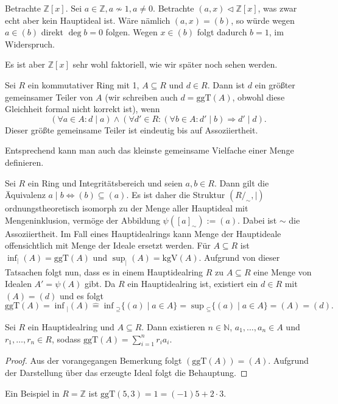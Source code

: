 \begin{example}
    Betrachte $\mathbb{Z}[x]$. Sei $a \in \mathbb{Z}, a \not\sim 1, a \neq 0$. Betrachte $({a,x}) \vartriangleleft \mathbb{Z}[x]$, was zwar echt aber kein Hauptideal ist. Wäre nämlich $({a,x}) = (b)$, so würde wegen $a \in (b)$ direkt $\deg b = 0$ folgen. Wegen $x \in (b)$ folgt dadurch $b = 1$, im Widerspruch.

    Es ist aber $\mathbb{Z}[x]$ sehr wohl faktoriell, wie wir später noch sehen werden.
\end{example}

\begin{definition}
    Sei $R$ ein kommutativer Ring mit 1, $A \subseteq R$ und $d \in R$. Dann ist $d$ ein größter gemeinsamer Teiler von $A$ (wir schreiben auch $d = \mathrm{ggT}(A)$, obwohl diese Gleichheit formal nicht korrekt ist), wenn
    $$ (\forall a \in A: d \mid a ) \land ( \forall d' \in R : ( \forall b \in A: d' \mid b ) \Rightarrow d' \mid d  ). $$
    Dieser größte gemeinsame Teiler ist eindeutig bis auf Assoziiertheit.

    Entsprechend kann man auch das kleinste gemeinsame Vielfache einer Menge definieren.
\end{definition}


\begin{remark}
    Sei $R$ ein Ring und Integritätsbereich und seien $a,b\in R$. Dann gilt die Äquivalenz
    $a\mid b\Leftrightarrow (b)\subseteq (a)$. Es ist daher die Struktur
    $(R/_\sim,\mid)$ ordnungstheoretisch isomorph zu der Menge aller Hauptideal mit Mengeninklusion,
    vermöge der Abbildung $\psi([a]_\sim):= (a)$. Dabei ist $\sim$ die Assoziiertheit. Im Fall eines
    Hauptidealrings kann \glqq Menge der Hauptideale\grqq{} offensichtlich mit \glqq Menge der Ideale\grqq{}
    ersetzt werden. Für $A\subseteq R$ ist $\inf_{\vert}(A)=\mathrm{ggT}(A)$ und $\sup_{\vert}(A)=\mathrm{kgV}(A)$.
    Aufgrund von dieser Tatsachen folgt nun, dass es in einem Hauptidealring $R$
    zu $A\subseteq R$ eine Menge von Idealen $A'=\psi(A)$ gibt. Da $R$ ein Hauptidealring ist,
    existiert ein $d\in R$ mit $(A)=(d)$ und es folgt
    $$\mathrm{ggT}(A)=\inf{}_|(A)\widehat{=}\inf{}_{\supseteq}\{(a)\mid a\in A\}=\sup{}_\subseteq\{(a)\mid a\in A\}=(A)=(d).$$
\end{remark}

\begin{lemma}
    Sei $R$ ein Hauptidealring und $A\subseteq R$. Dann existieren
    $n\in\mathbb{N}$, $a_1,\ldots,a_n\in A$ und $r_1,\ldots,r_n\in R$, sodass $\mathrm{ggT}(A)=\sum_{i=1}^nr_ia_i$.
\end{lemma}

\begin{proof}
    Aus der vorangegangen Bemerkung folgt $(\textrm{ggT}(A))=(A)$. Aufgrund der Darstellung über das erzeugte Ideal folgt die Behauptung.
\end{proof}

\begin{example}
    Ein Beispiel in $R=\mathbb{Z}$ ist $\textrm{ggT}(5,3)=1=(-1)5+2\cdot 3$.
\end{example}